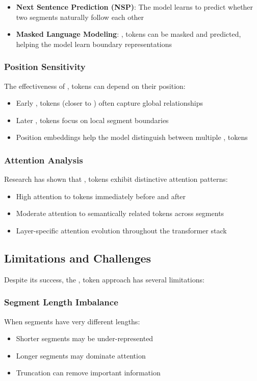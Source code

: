 \begin{itemize}
\item \textbf{Next Sentence Prediction (NSP)}: The model learns to predict whether two segments naturally follow each other
\item \textbf{Masked Language Modeling}: \sep{} tokens can be masked and predicted, helping the model learn boundary representations
\end{itemize}

\subsubsection{Position Sensitivity}
The effectiveness of \sep{} tokens can depend on their position:
\begin{itemize}
\item Early \sep{} tokens (closer to \cls{}) often capture global relationships
\item Later \sep{} tokens focus on local segment boundaries
\item Position embeddings help the model distinguish between multiple \sep{} tokens
\end{itemize}

\subsubsection{Attention Analysis}
Research has shown that \sep{} tokens exhibit distinctive attention patterns:
\begin{itemize}
\item High attention to tokens immediately before and after
\item Moderate attention to semantically related tokens across segments
\item Layer-specific attention evolution throughout the transformer stack
\end{itemize}

\subsection{Limitations and Challenges}

Despite its success, the \sep{} token approach has several limitations:

\subsubsection{Segment Length Imbalance}
When segments have very different lengths:
\begin{itemize}
\item Shorter segments may be under-represented
\item Longer segments may dominate attention
\item Truncation can remove important information
\end{itemize}

